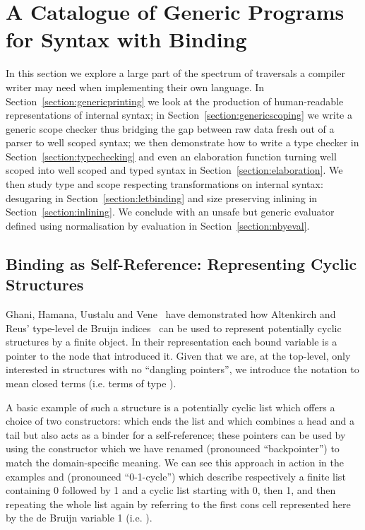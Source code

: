 \section{A Catalogue of Generic Programs for Syntax with Binding}

In this section we explore a large part of the spectrum of traversals a
compiler writer may need when implementing their own language.
In Section~\ref{section:genericprinting} we look at the production of
human-readable representations of internal syntax; in Section~\ref{section:genericscoping}
we write a generic scope checker thus bridging the gap between raw data
fresh out of a parser to well scoped syntax; we then demonstrate how to
write a type checker in Section~\ref{section:typechecking} and even an
elaboration function turning well scoped into well scoped and typed syntax
in Section~\ref{section:elaboration}. We then study type and scope respecting
transformations on internal syntax: desugaring in Section~\ref{section:letbinding}
and size preserving inlining in Section~\ref{section:inlining}. We conclude
with an unsafe but generic evaluator defined using normalisation by evaluation
in Section~\ref{section:nbyeval}.









\subsection{Binding as Self-Reference: Representing Cyclic Structures}\label{def:colist}

Ghani, Hamana, Uustalu and Vene~\citeyear{ghani2006representing} have
demonstrated how Altenkirch and Reus' type-level de Bruijn
indices~\citeyear{altenkirch1999monadic} can be used to represent
potentially cyclic structures by a finite object. In their
representation each bound variable is a pointer to the node
that introduced it. Given that we are, at the top-level, only
interested in structures with no ``dangling pointers'', we introduce
the notation   to mean closed terms (i.e. terms of type
   \AIC{[]}).

A basic example of such a structure is a potentially cyclic list which
offers a choice of two constructors: \AIC{[]} which ends the list and
\AIC{\_::\_} which combines a head and a tail but also acts as a binder
for a self-reference; these pointers can be used by using the 
constructor which we have renamed  (pronounced ``backpointer'')
to match the domain-specific meaning.
We can see this approach in action in the examples
\AF{[0, 1]} and  (pronounced ``0-1-cycle'') which describe
respectively a finite list containing
0 followed by 1 and a cyclic list starting with 0, then 1, and then
repeating the whole list again by referring to the first cons cell
represented here by the de Bruijn variable 1 (i.e.  ).

